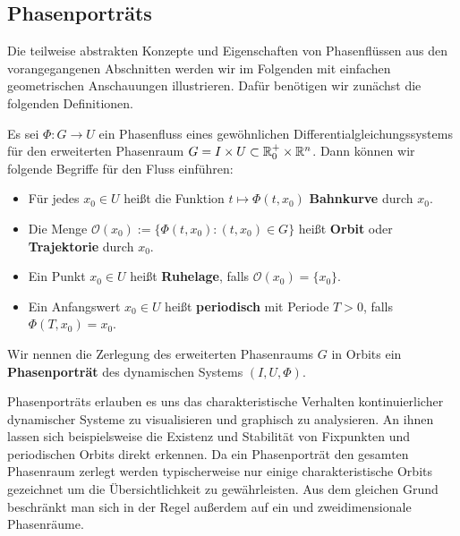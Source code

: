 \subsection{Phasenporträts}
\label{\detokenize{ode/fluesse:phasenportrats}}
\par
Die teilweise abstrakten Konzepte und Eigenschaften von Phasenflüssen aus den vorangegangenen Abschnitten werden wir im Folgenden mit einfachen geometrischen Anschauungen illustrieren.
Dafür benötigen wir zunächst die folgenden Definitionen.
\label{ode/fluesse:definition-4}
\begin{definition}{}{}



\par
Es sei \(\Phi:G\rightarrow U\) ein Phasenfluss eines gewöhnlichen Differentialgleichungssystems für den erweiterten Phasenraum \(G = I \times U\subset \mathbb{R}^+_0\times \mathbb{R}^n\).
Dann können wir folgende Begriffe für den Fluss einführen:
\begin{itemize}
\item {} 
\par
Für jedes \(x_0\in U\) heißt die Funktion \(t\mapsto \Phi(t, x_0)\) \textbf{Bahnkurve} durch \(x_0\).

\item {} 
\par
Die Menge \(\mathcal{O}(x_0) := \{\Phi(t, x_0): (t, x_0)\in G\}\) heißt \textbf{Orbit} oder \textbf{Trajektorie} durch \(x_0\).

\item {} 
\par
Ein Punkt \(x_0 \in U\) heißt \textbf{Ruhelage}, falls \(\mathcal{O}(x_0) = \{x_0\}\).

\item {} 
\par
Ein Anfangswert \(x_0\in U\) heißt \textbf{periodisch} mit Periode \(T>0\), falls \(\Phi(T, x_0) = x_0\).

\end{itemize}

\par
Wir nennen die Zerlegung des erweiterten Phasenraums \(G\) in Orbits ein \textbf{Phasenporträt} des dynamischen Systems \((I,U, \Phi)\).
\end{definition}

\par
Phasenporträts erlauben es uns das charakteristische Verhalten kontinuierlicher dynamischer Systeme zu visualisieren und graphisch zu analysieren.
An ihnen lassen sich beispielsweise die Existenz und Stabilität von Fixpunkten und periodischen Orbits direkt erkennen.
Da ein Phasenporträt den gesamten Phasenraum zerlegt werden typischerweise nur einige charakteristische Orbits gezeichnet um die Übersichtlichkeit zu gewährleisten.
Aus dem gleichen Grund beschränkt man sich in der Regel außerdem auf ein  und zweidimensionale Phasenräume.

